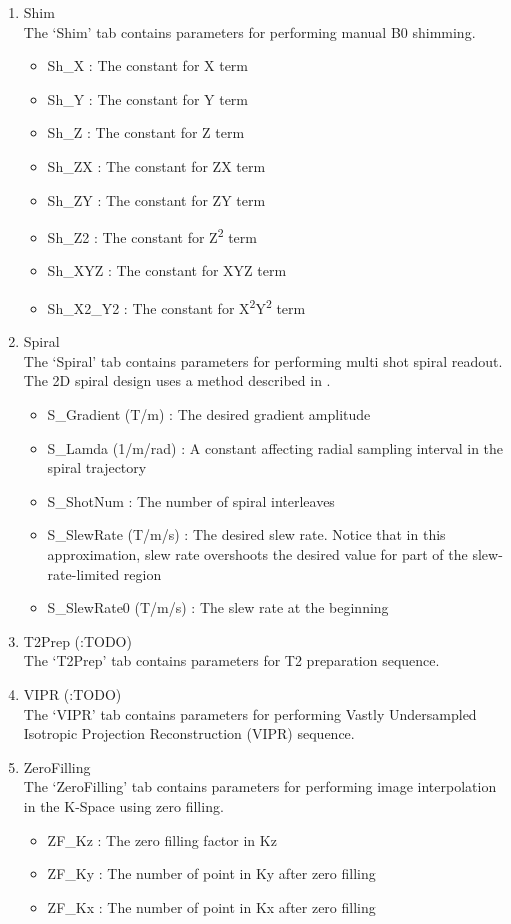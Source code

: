 \documentclass{book}%
\begin{document}
\begin{enumerate}
	\item Shim \\
	The `Shim' tab contains parameters for performing manual B0 shimming.
		\begin{itemize}
			\item Sh\_X : The constant for X term
			\item Sh\_Y : The constant for Y term
			\item Sh\_Z :  The constant for Z term
			\item Sh\_ZX : The constant for ZX term
			\item Sh\_ZY : The constant for ZY term
			\item Sh\_Z2 : The constant for Z\textsuperscript{2} term
			\item Sh\_XYZ : The constant for XYZ term
			\item Sh\_X2\_Y2 : The constant for X\textsuperscript{2}Y\textsuperscript{2} term
		\end{itemize}
	
	\item Spiral \\
	The `Spiral' tab contains parameters for performing multi shot spiral readout. The 2D spiral design uses a method described in \cite{Glover2005}.
		\begin{itemize}
			\item S\_Gradient (T/m) : The desired gradient amplitude
			\item S\_Lamda (1/m/rad) : A constant affecting radial sampling interval in the spiral trajectory
			\item S\_ShotNum : The number of spiral interleaves
			\item S\_SlewRate (T/m/s) : The desired slew rate. Notice that in this approximation, slew rate overshoots the desired value for part of the slew-rate-limited region
			\item S\_SlewRate0 (T/m/s) : The slew rate at the beginning
		\end{itemize}
	
  \item T2Prep (:TODO) \\
	The `T2Prep' tab contains parameters for T2 preparation sequence.
	
	\item VIPR (:TODO) \\
	The `VIPR' tab contains parameters for performing Vastly Undersampled Isotropic Projection Reconstruction (VIPR) sequence.
	
	\item ZeroFilling \\
	The `ZeroFilling' tab contains parameters for performing image interpolation in the K-Space using zero filling.
		\begin{itemize}
			\item ZF\_Kz : The zero filling factor in Kz
			\item ZF\_Ky : The number of point in Ky after zero filling
			\item ZF\_Kx : The number of point in Kx after zero filling
		\end{itemize}
	
\end{enumerate}
\end{document}
